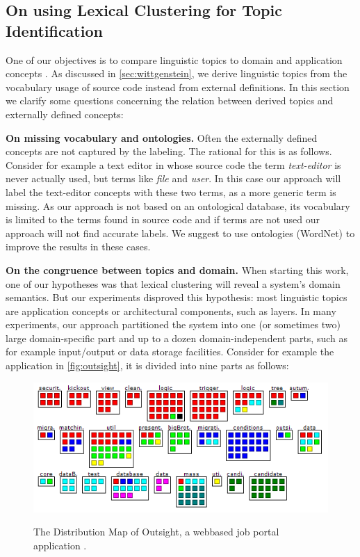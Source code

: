 \subsection{On using Lexical Clustering for Topic Identification}

One of our objectives is to compare linguistic topics to domain and application concepts \cite{Bigg93a}. As discussed in \autoref{sec:wittgenstein}, we derive linguistic topics from the vocabulary usage of source code instead from external definitions. In this section we clarify some questions concerning the relation between derived topics and externally defined concepts:

\textbf{On missing vocabulary and ontologies.} Often the externally defined concepts are not captured by the labeling. The rational for this is as follows. Consider for example a text editor in whose source code the term \emph{text-editor} is never actually used, but terms like \emph{file} and \emph{user}. In this case our approach will label the text-editor concepts with these two terms, as a more generic term is missing. As our approach is not based on an ontological database, its vocabulary is limited to the terms found in source code and if terms are not used our approach will not find accurate labels. We suggest to use ontologies (\ie WordNet) to improve the results in these cases.

\textbf{On the congruence between topics and domain.} When starting this work, one of our hypotheses was that lexical clustering will reveal a system's domain semantics. But our experiments disproved this hypothesis: most linguistic topics are application concepts or architectural components, such as layers. In many experiments, our approach partitioned the system into one (or sometimes two) large domain-specific part and up to a dozen domain-independent parts, such as for example input/output or data storage facilities. Consider for example the application in \autoref{fig:outsight}, it is divided into nine parts as follows:

\begin{figure}[h]
  \includegraphics[width=\linewidth]{fig/hapax-outsight-distribution}\\
  \caption{The Distribution Map of Outsight, a webbased job portal application \cite{Kuhn06a}.}\label{fig:outsight}
\end{figure}


